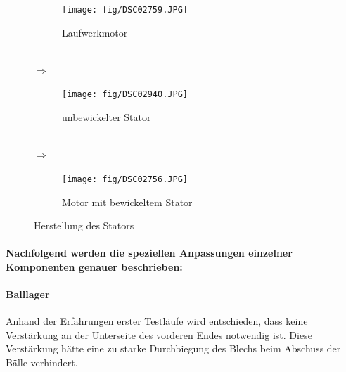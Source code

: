 \begin{figure}[h!]
    \begin{center}
        \begin{minipage}[c]{0.25\textwidth}
            \begin{subfigure}[a]{\textwidth}
                \texttt{[image: fig/DSC02759.JPG]}
                \caption{Laufwerkmotor \\ $\qquad$}
                \label{m_motor_stator_before}
            \end{subfigure}
        \end{minipage}
        \begin{minipage}[c]{0.05\textwidth}
            \Huge$\Rightarrow$
        \end{minipage}
        \begin{minipage}[c]{0.25\textwidth}
            \begin{subfigure}[a]{\textwidth}
                \texttt{[image: fig/DSC02940.JPG]}
                \caption{unbewickelter Stator \\ $\qquad$}
                \label{m_motor_stator_empty}
            \end{subfigure}
        \end{minipage}
        \begin{minipage}[c]{0.05\textwidth}
            \Huge$\Rightarrow$
        \end{minipage}
        \begin{minipage}[c]{0.25\textwidth}
            \begin{subfigure}[a]{\textwidth}
                \texttt{[image: fig/DSC02756.JPG]}
                \caption{Motor mit bewickeltem Stator}
                \label{m_motor_stator_finished}
            \end{subfigure}
        \end{minipage}
    \end{center}
    \caption{Herstellung des Stators}
    \label{m_motor_stator}
\end{figure}
\FloatBarrier

\paragraph{Nachfolgend werden die speziellen Anpassungen einzelner Komponenten genauer beschrieben:}

\paragraph{Balllager}
Anhand der Erfahrungen erster Testläufe wird entschieden, dass keine 
Verstärkung an der Unterseite des vorderen Endes notwendig ist. Diese 
Verstärkung hätte eine zu starke Durchbiegung des Blechs beim 
Abschuss der Bälle verhindert.

